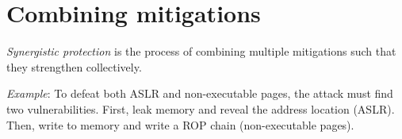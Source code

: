 \section{Combining mitigations}
\emph{Synergistic protection} is the process of combining multiple mitigations such that they strengthen collectively. 

\medskip

\emph{Example}: To defeat both ASLR and non-executable pages, the attack must find two vulnerabilities. First, leak memory and reveal the address location (ASLR). Then, write to memory and write a ROP chain (non-executable pages).